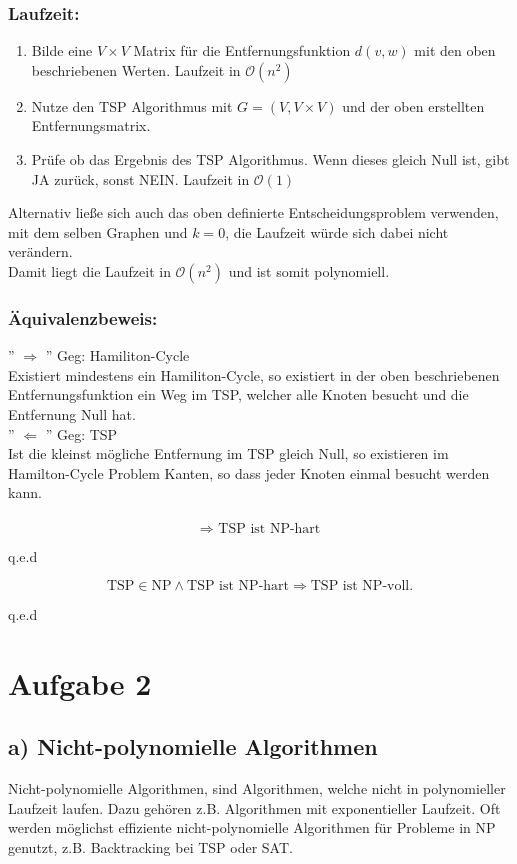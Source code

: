 \documentclass[a4paper,11pt,twoside]{article}
\begin{document}
\subsubsection*{Laufzeit:} 
\begin{enumerate}	
	\item Bilde eine $V\times V$ Matrix für die Entfernungsfunktion $d(v,w)$ mit den oben beschriebenen Werten. Laufzeit in $\mathcal{O}(n^2)$
	\item Nutze den TSP Algorithmus mit $G=(V,V\times V)$ und der oben erstellten Entfernungsmatrix.
	\item Prüfe ob das Ergebnis des TSP Algorithmus. Wenn dieses gleich Null ist, gibt JA zurück, sonst NEIN. Laufzeit in $\mathcal{O}(1)$
\end{enumerate}
Alternativ ließe sich auch das oben definierte Entscheidungsproblem verwenden, mit dem selben Graphen und $k=0$, die Laufzeit würde sich dabei nicht verändern.\\
Damit liegt die Laufzeit in $\mathcal{O}(n^2)$ und ist somit polynomiell.

 \subsubsection*{Äquivalenzbeweis:} 
'' $\Rightarrow$ ''
Geg: Hamiliton-Cycle\\
Existiert mindestens ein Hamiliton-Cycle, so existiert in der oben beschriebenen Entfernungsfunktion ein Weg im TSP, welcher alle Knoten besucht und die Entfernung Null hat. \\

'' $\Leftarrow$ ''
Geg: TSP\\
Ist die kleinst mögliche Entfernung im TSP gleich Null, so existieren im Hamilton-Cycle Problem Kanten, so dass jeder Knoten einmal besucht werden kann. \\
\\
\[ \Rightarrow \text{ TSP ist NP-hart} \]
\begin{flushright}
	q.e.d
\end{flushright}
\[ \text{TSP}\in \text{NP} \land \text{TSP ist NP-hart} \Rightarrow \text{TSP ist NP-voll.} \]
\begin{flushright}
	q.e.d
	\end{flushright}
\section*{Aufgabe 2}
\subsection*{a) Nicht-polynomielle Algorithmen}
Nicht-polynomielle Algorithmen, sind Algorithmen, welche nicht in polynomieller Laufzeit laufen. Dazu gehören z.B. Algorithmen mit exponentieller Laufzeit. Oft werden möglichst effiziente nicht-polynomielle Algorithmen für Probleme in NP genutzt, z.B. Backtracking bei TSP oder SAT.
\end{document}
